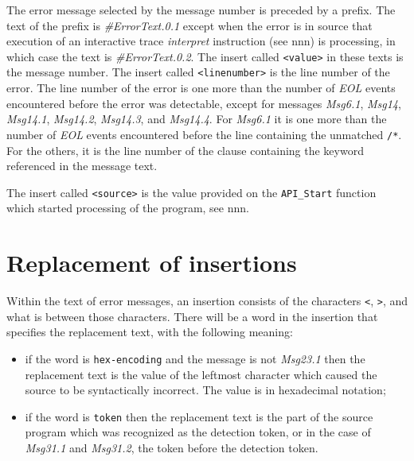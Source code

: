 The error message selected by the message number is preceded by a
prefix. The text of the prefix is \emph{\#ErrorText.0.1} except when the
error is in source that execution of an interactive trace
\emph{interpret} instruction (see nnn) is processing, in which case the
text is \emph{\#ErrorText.0.2}. The insert called
\texttt{\textless{}value\textgreater{}} in these texts is the message
number. The insert called \texttt{\textless{}linenumber\textgreater{}}
is the line number of the error. The line number of the error is one
more than the number of \emph{EOL} events encountered before the error
was detectable, except for messages \emph{Msg6.1}, \emph{Msg14},
\emph{Msg14.1}, \emph{Msg14.2}, \emph{Msg14.3}, and \emph{Msg14.4}. For
\emph{Msg6.1} it is one more than the number of \emph{EOL} events
encountered before the line containing the unmatched
\texttt{\textquotesingle{}/*\textquotesingle{}}. For the others, it is
the line number of the clause containing the keyword referenced in the
message text.

The insert called \texttt{\textless{}source\textgreater{}} is the value
provided on the \texttt{API\_Start} function which started processing of
the program, see nnn.

\section{Replacement of insertions}\label{replacement-of-insertions}

Within the text of error messages, an insertion consists of the
characters \texttt{\textquotesingle{}\textless{}\textquotesingle{}},
\texttt{\textquotesingle{}\textgreater{}\textquotesingle{}}, and what is
between those characters. There will be a word in the insertion that
specifies the replacement text, with the following meaning:

\begin{itemize}
\item
  if the word is
  \texttt{\textquotesingle{}hex-encoding\textquotesingle{}} and the
  message is not \emph{Msg23.1} then the replacement text is the value
  of the leftmost character which caused the source to be syntactically
  incorrect. The value is in hexadecimal notation;
\item
  if the word is \texttt{\textquotesingle{}token\textquotesingle{}} then
  the replacement text is the part of the source program which was
  recognized as the detection token, or in the case of \emph{Msg31.1}
  and \emph{Msg31.2}, the token before the detection token.
\end{itemize}

